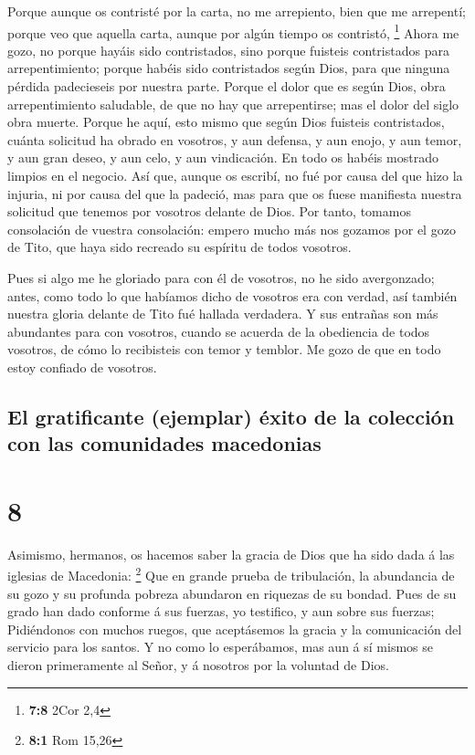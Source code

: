  Porque aunque os contristé por la carta, no me arrepiento,
bien que me arrepentí; porque veo que aquella carta, aunque por algún
tiempo os contristó, \footnote{\textbf{7:8} 2Cor 2,4}  Ahora
me gozo, no porque hayáis sido contristados, sino porque fuisteis
contristados para arrepentimiento; porque habéis sido contristados según
Dios, para que ninguna pérdida padecieseis por nuestra parte.
 Porque el dolor que es según Dios, obra arrepentimiento
saludable, de que no hay que arrepentirse; mas el dolor del siglo obra
muerte.  Porque he aquí, esto mismo que según Dios fuisteis
contristados, cuánta solicitud ha obrado en vosotros, y aun defensa, y
aun enojo, y aun temor, y aun gran deseo, y aun celo, y aun vindicación.
En todo os habéis mostrado limpios en el negocio.  Así que,
aunque os escribí, no fué por causa del que hizo la injuria, ni por
causa del que la padeció, mas para que os fuese manifiesta nuestra
solicitud que tenemos por vosotros delante de Dios.  Por
tanto, tomamos consolación de vuestra consolación: empero mucho más nos
gozamos por el gozo de Tito, que haya sido recreado su espíritu de todos
vosotros.

 Pues si algo me he gloriado para con él de vosotros, no he
sido avergonzado; antes, como todo lo que habíamos dicho de vosotros era
con verdad, así también nuestra gloria delante de Tito fué hallada
verdadera.  Y sus entrañas son más abundantes para con
vosotros, cuando se acuerda de la obediencia de todos vosotros, de cómo
lo recibisteis con temor y temblor.  Me gozo de que en todo
estoy confiado de vosotros.

\hypertarget{el-gratificante-ejemplar-uxe9xito-de-la-colecciuxf3n-con-las-comunidades-macedonias}{%
\subsection{El gratificante (ejemplar) éxito de la colección con las
comunidades
macedonias}\label{el-gratificante-ejemplar-uxe9xito-de-la-colecciuxf3n-con-las-comunidades-macedonias}}

\hypertarget{section-7}{%
\section{8}\label{section-7}}

 Asimismo, hermanos, os hacemos saber la gracia de Dios que
ha sido dada á las iglesias de Macedonia: \footnote{\textbf{8:1} Rom
  15,26}  Que en grande prueba de tribulación, la abundancia
de su gozo y su profunda pobreza abundaron en riquezas de su bondad.
 Pues de su grado han dado conforme á sus fuerzas, yo
testifico, y aun sobre sus fuerzas;  Pidiéndonos con muchos
ruegos, que aceptásemos la gracia y la comunicación del servicio para
los santos.  Y no como lo esperábamos, mas aun á sí mismos
se dieron primeramente al Señor, y á nosotros por la voluntad de Dios.


